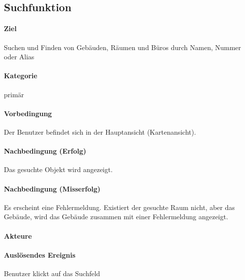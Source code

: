 \subsection{Suchfunktion}
\label{Suchfunktion}
\paragraph{Ziel}
Suchen und Finden von Gebäuden, Räumen und Büros durch Namen, Nummer oder Alias
\paragraph{Kategorie}
primär
\paragraph{Vorbedingung}
Der Benutzer befindet sich in der Hauptansicht (Kartenansicht).
\paragraph{Nachbedingung (Erfolg)}
Das gesuchte Objekt wird angezeigt.
\paragraph{Nachbedingung (Misserfolg)}
Es erscheint eine Fehlermeldung. Existiert der gesuchte Raum nicht, aber das Gebäude, wird das Gebäude zusammen mit einer Fehlermeldung angezeigt.
\paragraph{Akteure}

\paragraph{Auslösendes Ereignis}
Benutzer klickt auf das Suchfeld
